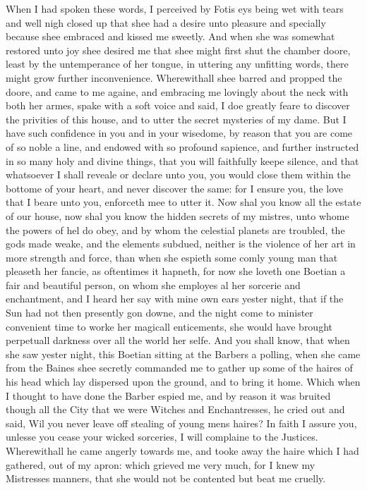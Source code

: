 When I had spoken these words, I perceived by Fotis eys being wet with tears
and well nigh closed up that shee had a desire unto pleasure and specially
because shee embraced and kissed me sweetly. And when she was somewhat restored
unto joy shee desired me that shee might first shut the chamber doore, least by
the untemperance of her tongue, in uttering any unfitting words, there might
grow further inconvenience. Wherewithall shee barred and propped the doore, and
came to me againe, and embracing me lovingly about the neck with both her
armes, spake with a soft voice and said, I doe greatly feare to discover the
privities of this house, and to utter the secret mysteries of my dame. But I
have such confidence in you and in your wisedome, by reason that you are come
of so noble a line, and endowed with so profound sapience, and further
instructed in so many holy and divine things, that you will faithfully keepe
silence, and that whatsoever I shall reveale or declare unto you, you would
close them within the bottome of your heart, and never discover the same: for I
ensure you, the love that I beare unto you, enforceth mee to utter it. Now shal
you know all the estate of our house, now shal you know the hidden secrets of
my mistres, unto whome the powers of hel do obey, and by whom the celestial
planets are troubled, the gods made weake, and the elements subdued, neither is
the violence of her art in more strength and force, than when she espieth some
comly young man that pleaseth her fancie, as oftentimes it hapneth, for now she
loveth one Boetian a fair and beautiful person, on whom she employes al her
sorcerie and enchantment, and I heard her say with mine own ears yester night,
that if the Sun had not then presently gon downe, and the night come to
minister convenient time to worke her magicall enticements, she would have
brought perpetuall darkness over all the world her selfe. And you shall know,
that when she saw yester night, this Boetian sitting at the Barbers a polling,
when she came from the Baines shee secretly commanded me to gather up some of
the haires of his head which lay dispersed upon the ground, and to bring it
home. Which when I thought to have done the Barber espied me, and by reason it
was bruited though all the City that we were Witches and Enchantresses, he
cried out and said, Wil you never leave off stealing of young mens haires? In
faith I assure you, unlesse you cease your wicked sorceries, I will complaine
to the Justices. Wherewithall he came angerly towards me, and tooke away the
haire which I had gathered, out of my apron: which grieved me very much, for I
knew my Mistresses manners, that she would not be contented but beat me
cruelly.

